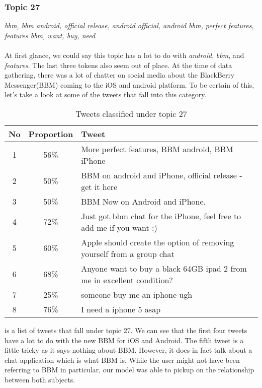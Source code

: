 \subsubsection{Topic 27}
\label{sec:topic_27}
\textit{bbm, bbm android, official release, android official, android bbm, perfect features,
features bbm, want, buy, need} \\\\
At first glance, we could say this topic has a lot to do with \textit{android}, \textit{bbm}, and
\textit{features}. The last three tokens also seem out of place. At the time of data gathering,
there was a lot of chatter on social media about the BlackBerry Messenger(BBM) coming to the iOS and
android platform. To be certain of this, let's take a look at some of the tweets that fall into this
category.

\begin{table}[H]
  \begin{tabular}{c c p{13cm}} \toprule
    No & Proportion & Tweet \\ \midrule
    1  & 56\%       & More perfect features, BBM android, BBM iPhone \\ \midrule
    2  & 50\%       & BBM on android and iPhone, official release - get it here \\ \midrule
    3  & 50\%       & BBM Now on Android and iPhone. \\ \midrule
    4  & 72\%       & Just got bbm chat for the iPhone, feel free to add me if you want :) \\ \midrule
    5  & 60\%       & Apple should create the option of removing yourself from a group chat \\ \midrule
    6  & 68\%       & Anyone want to buy a black 64GB ipad 2 from me in excellent condition? \\ \midrule
    7  & 25\%       & someone buy me an iphone ugh \\ \midrule
    8  & 76\%       & I need a iphone 5 asap \\ \bottomrule
  \end{tabular}
  \caption{Tweets classified under topic 27}
  \label{tab:tweets_under_27}
\end{table}

 is a list of tweets that fall under topic 27. We can see that the
first four tweets have a lot to do with the new BBM for iOS and Android. The fifth tweet is a little
tricky as it says nothing about BBM\@. However, it does in fact talk about a chat application which is
what BBM is. While the user might not have been referring to BBM in particular, our model was able
to pickup on the relationship between both subjects.

